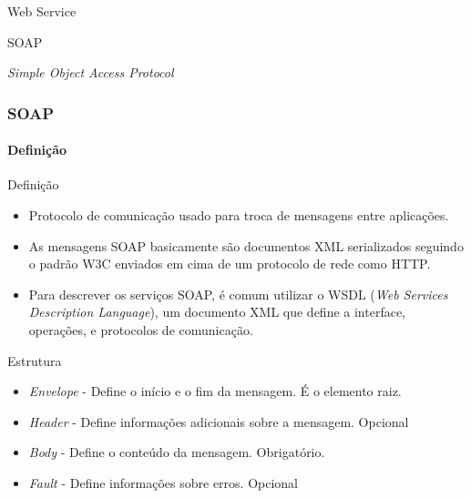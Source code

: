 \documentclass[
	9pt, %
	t, %
]{beamer}
\begin{document}
\begin{frame}
	\begin{center}
		
		\bigskip\bigskip\bigskip\bigskip %
		{\Large Web Service}
		
		\bigskip\bigskip %
		{\Huge SOAP}
		
		\smallskip
		{\small \textit{Simple Object Access Protocol}}
	\end{center}

\end{frame}

\begin{frame}
	\frametitle{SOAP}
	\framesubtitle{Definição}
	
	\begin{block}{Definição}
		\begin{itemize}
			\item Protocolo de comunicação usado para troca de mensagens entre aplicações.
			\item As mensagens SOAP basicamente são \alert{documentos XML} serializados seguindo o padrão W3C enviados em cima de um protocolo de rede como HTTP.
			\item Para descrever os serviços SOAP, é comum utilizar o WSDL (\textit{Web Services Description Language}), um documento XML que define a interface, operações, e protocolos de comunicação.
		\end{itemize}
	\end{block}

	\begin{exampleblock}{Estrutura}
		\begin{itemize}
			\item \textit{Envelope} - Define o início e o fim da mensagem. É o elemento raiz.
			\item \textit{Header} - Define informações adicionais sobre a mensagem. Opcional
			\item \textit{Body} - Define o conteúdo da mensagem. Obrigatório.
			\item \textit{Fault} - Define informações sobre erros. Opcional
		\end{itemize}
	\end{exampleblock}

\end{frame}
\end{document}
